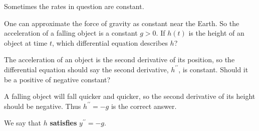 \documentclass{ximera}
\begin{document}
Sometimes the rates in question are constant. 



\begin{question}
  One can approximate the force of gravity as constant near the Earth.
  So the acceleration of a falling object is a constant $g>0$.  If
  $h(t)$ is the height of an object at time $t$, which differential
  equation describes $h$?
  \begin{multipleChoice}
  \end{multipleChoice}
  
  \begin{hint}
    The acceleration of an object is the second derivative of its
    position, so the differential equation should say the second
    derivative, $h^{\prime\prime}$, is constant.  Should it be a positive of
    negative constant?
  \end{hint}
  \begin{hint}
    A falling object will fall quicker and quicker, so the second
    derivative of its height should be negative.  Thus $h^{\prime\prime}=-g$ is the
    correct answer.
  \end{hint}	
\end{question}
We say that $h$ \textbf{satisfies}  $y^{\prime\prime}=-g$. \\
\end{document}
